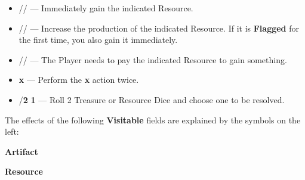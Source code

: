 \begin{multicols*}{2}
\medskip

\begin{itemize}[itemsep=0.4em]
  \item [{\LARGE\textbf{+}}]
    // —
    Immediately gain the indicated Resource.
  \item [{}]
    // —
    Increase the production of the indicated Resource.
    If it is \textbf{Flagged} for the first time, you also gain it immediately.
  \item [{}]
    //  —
    The Player needs to pay the indicated Resource to gain something.
  \item [{\LARGE\textbf{2}}] {\LARGE\textbf{x}} —
    Perform the {\LARGE\textbf{x}} action twice.
  \item [{\LARGE\textbf{2}}] /{\LARGE\textbf{2}}  {\LARGE\textbf{1}} —
    Roll 2 Treasure or Resource Dice and choose one to be resolved.
\end{itemize}

\phantom{}
\vspace*{\fill}
\columnbreak

The effects of the following \textbf{Visitable} \hypertarget{All Map Locations}{fields} are explained by the symbols on the left:

\medskip

{\centering
  \phantom{j}\textbf{Artifact}\\

  \bigskip

  \phantom{j}\textbf{Resource}\\
  \\

}
\end{multicols*}

